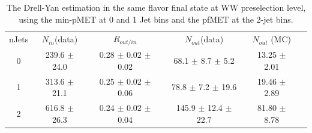 \begin{table}
\begin{center}
\begin{tabular}{c c c c c c}
\hline
       nJets & $N_{in}$(data)        & $R_{out/in}$        & $N_{out}$(data)  & $N_{out}$ (MC) \\ 
 0 & 239.6 $\pm$ 24.0 & 0.28 $\pm$ 0.02 $\pm$ 0.02 & 68.1 $\pm$ 8.7 $\pm$ 5.2 & 13.25 $\pm$ 2.01 \\
 1 & 313.6 $\pm$ 21.1 & 0.25 $\pm$ 0.02 $\pm$ 0.06 & 78.8 $\pm$ 7.2 $\pm$ 19.6  & 19.46 $\pm$ 2.89 \\
 2 & 616.8 $\pm$ 26.3 & 0.24 $\pm$ 0.02 $\pm$ 0.04 & 145.9 $\pm$ 12.4 $\pm$ 22.7  & 81.80 $\pm$ 8.78 \\
\hline
\end{tabular}
\caption{The Drell-Yan estimation in the same flavor final state at WW preselection level, using the min-pMET at 
0 and 1 Jet bins and the pfMET at the 2-jet bins. }
\label{tab:dy_wwlevel}
\end{center}
\end{table}

